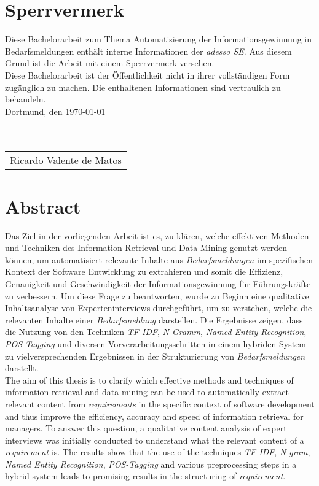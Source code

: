 \documentclass[a4paper,12pt]{scrreprt}
\begin{document}
\pagestyle{empty}




\pagestyle{fancy}
\chapter*{Sperrvermerk}
Diese Bachelorarbeit zum Thema \glqq Automatisierung der Informationsgewinnung in Bedarfsmeldungen\grqq{} enthält interne Informationen der \emph{adesso SE}. Aus diesem Grund ist die Arbeit mit einem Sperrvermerk versehen.\\

Diese Bachelorarbeit ist der Öffentlichkeit nicht in ihrer vollständigen Form zugänglich zu machen. Die enthaltenen Informationen sind vertraulich zu behandeln.\\

Dortmund, den \today \\ \\ \\
\begin{tabular}{@{}l@{}}\hline
	Ricardo Valente de Matos
\end{tabular}
\newpage
\chapter*{Abstract}
Das Ziel in der vorliegenden Arbeit ist es, zu klären, welche effektiven Methoden und Techniken des Information Retrieval und Data-Mining genutzt werden können, um automatisiert relevante Inhalte aus \emph{Bedarfsmeldungen} im spezifischen Kontext der Software Entwicklung zu extrahieren und somit die Effizienz, Genauigkeit und Geschwindigkeit der Informationsgewinnung für Führungskräfte zu verbessern. Um diese Frage zu beantworten, wurde zu Beginn eine qualitative Inhaltsanalyse von Experteninterviews durchgeführt, um zu verstehen, welche die relevanten Inhalte einer \emph{Bedarfsmeldung} darstellen. Die Ergebnisse zeigen, dass die Nutzung von den Techniken \emph{TF-IDF}, \emph{N-Gramm}, \emph{Named Entity Recognition}, \emph{POS-Tagging} und diversen Vorverarbeitungsschritten in einem hybriden System zu vielversprechenden Ergebnissen in der Strukturierung von \emph{Bedarfsmeldungen} darstellt.\\

The aim of this thesis is to clarify which effective methods and techniques of information retrieval and data mining can be used to automatically extract relevant content from \emph{requirements} in the specific context of software development and thus improve the efficiency, accuracy and speed of information retrieval for managers. To answer this question, a qualitative content analysis of expert interviews was initially conducted to understand what the relevant content of a \emph{requirement} is. The results show that the use of the techniques \emph{TF-IDF}, \emph{N-gram}, \emph{Named Entity Recognition}, \emph{POS-Tagging} and various preprocessing steps in a hybrid system leads to promising results in the structuring of \emph{requirement}.
\newpage
\end{document}
